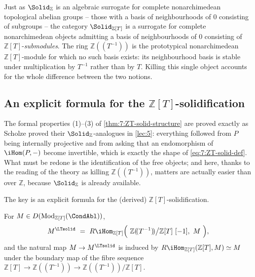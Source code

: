 \begin{remark}
\label{rmk:7:nonarch-interpretation}
Just as $\Solid_{\mathbb{Z}}$ is an algebraic surrogate for complete
nonarchimedean topological abelian groups -- those with a basis of
neighbourhoods of $0$ consisting of subgroups -- the category
$\Solid_{\mathbb{Z}[T]}$ is a surrogate for complete nonarchimedean objects
admitting a basis of neighbourhoods of $0$ consisting of
$\mathbb{Z}[T]$-\emph{submodules}. The ring $\mathbb{Z}(\!(T^{-1})\!)$ is the
prototypical nonarchimedean $\mathbb{Z}[T]$-module for which no such basis
exists: its neighbourhood basis is stable under multiplication by $T^{-1}$
rather than by $T$. Killing this single object accounts for the whole
difference between the two notions.
\end{remark}

\subsection{An explicit formula for the
\texorpdfstring{$\mathbb{Z}[T]$}{Z[T]}-solidification}

The formal properties (1)--(3) of \cref{thm:7:ZT-solid-structure} are proved
exactly as Scholze proved their $\Solid_{\mathbb{Z}}$-analogues in
\cref{lec:5}: everything followed from $P$ being internally projective and from
asking that an endomorphism of $\iHom(P,-)$ become invertible, which is exactly
the shape of \eqref{eq:7:ZT-solid-def}. What must be redone is the
identification of the free objects; and here, thanks to the reading of the
theory as killing $\mathbb{Z}(\!(T^{-1})\!)$, matters are actually easier than
over $\mathbb{Z}$, because $\Solid_{\mathbb{Z}}$ is already available.

The key is an explicit formula for the (derived) $\mathbb{Z}[T]$-solidification.

\begin{proposition}
\label{prop:7:solidification-formula}
For $M\in D(\mathrm{Mod}_{\mathbb{Z}[T]}(\CondAbl))$,
\begin{equation}
\label{eq:7:solidification-formula}
M^{\LTsolid}\ =\ R\iHom_{\mathbb{Z}[T]}\Bigl(\
\mathbb{Z}(\!(T^{-1})\!)\big/\mathbb{Z}[T]\ [-1],\ M\ \Bigr),
\end{equation}
and the natural map $M\to M^{\LTsolid}$ is induced by
$R\iHom_{\mathbb{Z}[T]}(\mathbb{Z}[T],M)\simeq M$ under the boundary map of the
fibre sequence $\mathbb{Z}[T]\to\mathbb{Z}(\!(T^{-1})\!)\to
\mathbb{Z}(\!(T^{-1})\!)/\mathbb{Z}[T]$.
\end{proposition}

